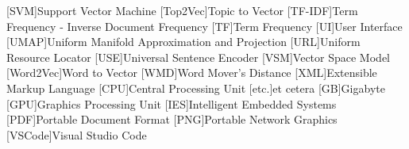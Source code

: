 \begin{acronym}[XXXXXXXXX]
    [SVM]{Support Vector Machine}
    [Top2Vec]{Topic to Vector}
    [TF-IDF]{Term Frequency - Inverse Document Frequency}
    [TF]{Term Frequency}
    [UI]{User Interface}
    [UMAP]{Uniform Manifold Approximation and Projection}
    [URL]{Uniform Resource Locator}
    [USE]{Universal Sentence Encoder}
    [VSM]{Vector Space Model}
    [Word2Vec]{Word to Vector}
    [WMD]{Word Mover's Distance}
    [XML]{Extensible Markup Language}
    [CPU]{Central Processing Unit}
    [etc.]{et cetera}    
    [GB]{Gigabyte}
    [GPU]{Graphics Processing Unit}
    [IES]{Intelligent Embedded Systems}
    [PDF]{Portable Document Format}
    [PNG]{Portable Network Graphics}
    [VSCode]{Visual Studio Code}

\end{acronym}

